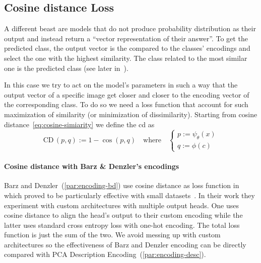 \subsection{Cosine distance Loss}
\label{subsec:cosine-distance-loss}

A different beast are models that do not produce probability distribution as their output and instead return a ``vector representation of their answer''. To get the predicted class, the output vector is the compared to the classes' encodings and select the one with the highest similarity. The class related to the most similar one is the predicted class (see later in~).

In this case we try to act on the model's parameters in such a way that the output vector of a specific image get closer and closer to the encoding vector of the corresponding class. To do so we need a loss function that account for such maximization of similarity (or minimization of dissimilarity).
Starting from cosine distance~\eqref{eq:cosine-simiarity} we define the \acrfull{cd} as
\begin{equation}
  \textrm{CD} \, (p, q) := 1 - \cos (p, q)
  \label{eq:cosine-distance}
  \quad \textrm{where} \quad
  \begin{cases}
    p := \psi_\theta(x) \\
    q := \phi(c)
  \end{cases}
\end{equation}

\paragraph{Cosine distance with Barz \& Denzler's encodings} Barz and Denzler~(\ref{par:encoding-bd}) use cosine distance as loss function in~\cite{HierarchyBasedBarz2018} which proved to be particularly effective with small datasets~\cite{DeepLearningOBarz2019}. In their work they experiment with custom architectures with multiple output heads. One uses cosine distance to align the head's output to their custom encoding while the latter uses standard cross entropy loss with one-hot encoding. The total loss function is just the sum of the two.
We avoid messing up with custom architectures so the effectiveness of Barz and Denzler encoding can be directly compared with PCA Description Encoding~(\ref{par:encoding-desc}).

